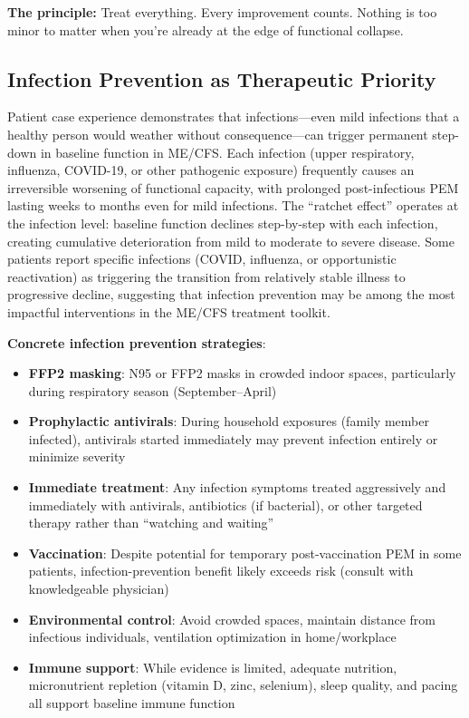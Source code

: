\textbf{The principle:} Treat everything. Every improvement counts. Nothing is too minor to matter when you're already at the edge of functional collapse.

\subsection{Infection Prevention as Therapeutic Priority}

\begin{observation}
\label{obs:infection-prevention-priority}
Patient case experience demonstrates that infections---even mild infections that a healthy person would weather without consequence---can trigger permanent step-down in baseline function in ME/CFS. Each infection (upper respiratory, influenza, COVID-19, or other pathogenic exposure) frequently causes an irreversible worsening of functional capacity, with prolonged post-infectious PEM lasting weeks to months even for mild infections. The ``ratchet effect'' operates at the infection level: baseline function declines step-by-step with each infection, creating cumulative deterioration from mild to moderate to severe disease. Some patients report specific infections (COVID, influenza, or opportunistic reactivation) as triggering the transition from relatively stable illness to progressive decline, suggesting that infection prevention may be among the most impactful interventions in the ME/CFS treatment toolkit.

\textbf{Concrete infection prevention strategies}:
\begin{itemize}
    \item \textbf{FFP2 masking}: N95 or FFP2 masks in crowded indoor spaces, particularly during respiratory season (September--April)
    \item \textbf{Prophylactic antivirals}: During household exposures (family member infected), antivirals started immediately may prevent infection entirely or minimize severity
    \item \textbf{Immediate treatment}: Any infection symptoms treated aggressively and immediately with antivirals, antibiotics (if bacterial), or other targeted therapy rather than ``watching and waiting''
    \item \textbf{Vaccination}: Despite potential for temporary post-vaccination PEM in some patients, infection-prevention benefit likely exceeds risk (consult with knowledgeable physician)
    \item \textbf{Environmental control}: Avoid crowded spaces, maintain distance from infectious individuals, ventilation optimization in home/workplace
    \item \textbf{Immune support}: While evidence is limited, adequate nutrition, micronutrient repletion (vitamin D, zinc, selenium), sleep quality, and pacing all support baseline immune function
\end{itemize}


\end{observation}

